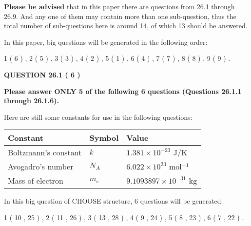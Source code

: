 \documentclass[12pt]{article}
\begin{document}
 
{\textbf{\large{Please be advised}}} that in this paper there are questions from
26.1 through
26.9.
And any one of them may contain more than one sub-question, thus the total number
of sub-questions here is around 14, of which
13 should be answered.
 
\vspace{0.3in}
 
 
   
   
   
\vspace{0.2in}
   
In this paper, big questions will be generated in the following order: 
   
   
             1 (           6 )
 ,
             2 (           5 )
 ,
             3 (           3 )
 ,
             4 (           2 )
 ,
             5 (           1 )
 ,
             6 (           4 )
 ,
             7 (           7 )
 ,
             8 (           8 )
 ,
             9 (           9 )
 .
  
\vspace{0.2in}
  
{\textbf{\Large{QUESTION
26.1 
 (           6 )
}}}
  
  
 
{\textbf{\Large{Please answer ONLY
5 of the following
6 questions (Questions
26.1.1 through
26.1.6). }}}
 
Here are still some constants for use in the following questions:
 
 
\noindent\begin{tabular}{|l|l|l|}
\hline
Constant & Symbol & Value \\
\hline
 
Boltzmann's constant &
$k$ &
 $ 1.381 \times 10^{-23} $
J/K \\
\hline
 
Avogadro's number &
$N_A$ &
 $ 6.022 \times 10^{23} $
mol$^{-1}$ \\
\hline
 
Mass of electron &
$m_e$ &
 $ 9.1093897 \times 10^{-31} $
kg \\
\hline
 
\end{tabular}
 
   
\vspace{0.2in}
   
 In this big question of CHOOSE structure,            6  questions will be generated: 
  
  
             1 (          10 ,          25 )
 ,
             2 (          11 ,          26 )
 ,
             3 (          13 ,          28 )
 ,
             4 (           9 ,          24 )
 ,
             5 (           8 ,          23 )
 ,
             6 (           7 ,          22 )
 .
  
\end{document}
